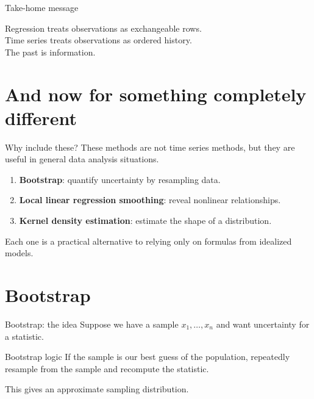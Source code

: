 \documentclass[aspectratio=169,11pt]{beamer}
\begin{document}
\begin{frame}{Take-home message}
\begin{center}
\Large
Regression treats observations as exchangeable rows.\\[0.4cm]
Time series treats observations as ordered history.\\[0.6cm]
\alert{The past is information.}
\end{center}
\end{frame}

\section{And now for something completely different}

\begin{frame}{Why include these?}
These methods are not time series methods, but they are useful in general data analysis situations.

\vspace{0.3cm}
\begin{enumerate}
  \item \textbf{Bootstrap}: quantify uncertainty by resampling data.
  \item \textbf{Local linear regression smoothing}: reveal nonlinear relationships.
  \item \textbf{Kernel density estimation}: estimate the shape of a distribution.
\end{enumerate}

\vspace{0.3cm}
Each one is a practical alternative to relying only on formulas from idealized models.
\end{frame}

\section{Bootstrap}

\begin{frame}{Bootstrap: the idea}
Suppose we have a sample \(x_1,\ldots,x_n\) and want uncertainty for a statistic.

\vspace{0.3cm}
\begin{block}{Bootstrap logic}
If the sample is our best guess of the population, repeatedly resample from the sample and recompute the statistic.
\end{block}

\vspace{0.3cm}
This gives an approximate sampling distribution.
\end{frame}
\end{document}
